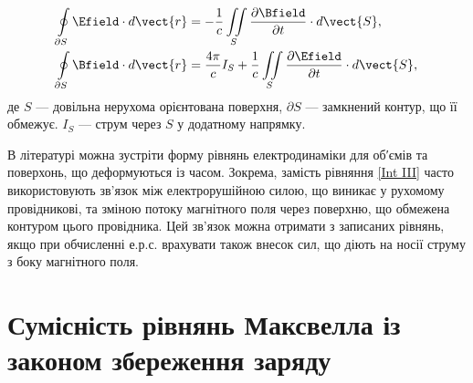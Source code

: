 \begin{align}
	\oint\limits_{\partial S} \Efield\cdot d\vect{r}  & = - \frac1c \iint\limits_S \frac{\partial\Bfield}{\partial t}\cdot d\vect{S}  \label{Int
	III},                                                          \\
	\oint\limits_{\partial S} \Bfield\cdot d\vect{r}  & =\dfrac{4\pi}{c} I_S +\frac{1}{c} \iint\limits_S
	\frac{\partial\Efield}{\partial t}\cdot d\vect{S}  \label{Int IV},
\end{align}
де $S$ --- довільна нерухома орієнтована поверхня, $\partial S$ --- замкнений
контур, що її обмежує. $I_S$ --- струм через $S$ у додатному напрямку.

В літературі можна зустріти форму рівнянь електродинаміки для об′ємів та поверхонь, що деформуються із часом. Зокрема, замість рівняння \eqref{Int III}
часто використовують зв’язок між електрорушійною силою, що виникає у рухомому провідникові, та зміною потоку магнітного поля через поверхню, що обмежена
контуром цього провідника. Цей зв’язок можна отримати з записаних рівнянь, якщо при обчисленні е.р.с. врахувати також внесок сил, що діють на носії
струму з боку магнітного поля.


\section{Сумісність рівнянь Максвелла із законом збереження заряду}


